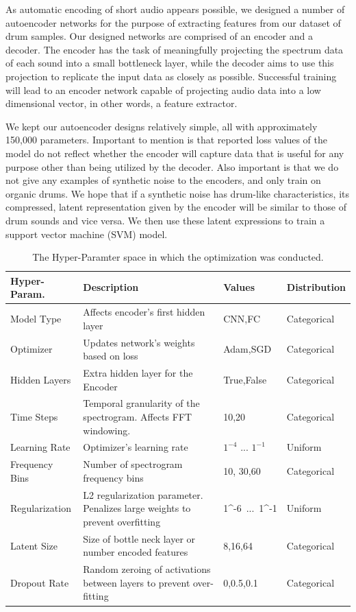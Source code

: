 \documentclass[\main/thesis.tex]{subfiles}
\begin{document}
As automatic encoding of short audio appears possible, we designed a number of autoencoder networks for the purpose of extracting features from our dataset of drum samples. Our designed networks are comprised of an encoder and a decoder. The encoder has the task of meaningfully projecting the spectrum data of each sound into a small bottleneck layer, while the decoder aims to use this projection to replicate the input data as closely as possible. Successful training will lead to an encoder network capable of projecting audio data into a low dimensional vector, in other words, a feature extractor. 

We kept our autoencoder designs relatively simple, all with approximately 150,000 parameters. Important to mention is that reported loss values of the model do not reflect whether the encoder will capture data that is useful for any purpose other than being utilized by the decoder. Also important is that we do not give any examples of synthetic noise to the encoders, and only train on organic drums. We hope that if a synthetic noise has drum-like characteristics, its compressed, latent representation given by the encoder will be similar to those of drum sounds and vice versa. We then use these latent expressions to train a support vector machine (SVM) model.
\begin{table}[h!]

\begin{tabular}{|p{28mm}|p{50mm}|p{21mm}|p{21mm}|}
\hline
Hyper-Param. & Description  & Values & Distribution\\ \hline
Model Type      &   Affects encoder's first hidden layer & CNN,FC & Categorical \\  \hline
Optimizer       & Updates network's weights based on loss & Adam,SGD & Categorical  \\  \hline
Hidden Layers   & Extra hidden layer for the Encoder & True,False & Categorical \\  \hline
Time Steps & Temporal granularity of the spectrogram. Affects FFT windowing. & 10,20 & Categorical  \\ \hline
Learning Rate   &    Optimizer's learning rate  & $1^{-4}$ ... $1^{-1}$ & Uniform      \\ \hline
Frequency Bins & Number of spectrogram frequency bins & 10, 30,60 & Categorical \\ \hline

Regularization  &  L2 regularization parameter. Penalizes large weights to prevent overfitting & 1^{-6}~...~1^{-1} & Uniform\\ \hline
Latent Size & Size of bottle neck layer or number encoded features & 8,16,64 & Categorical              \\ \hline
Dropout Rate & Random zeroing of activations between layers to prevent over-fitting & 0,0.5,0.1 & Categorical\\  \hline
\end{tabular}
\caption{The Hyper-Paramter space in which the optimization was conducted.}
\end{table}
\label{table:hyper_params}
\end{document}
